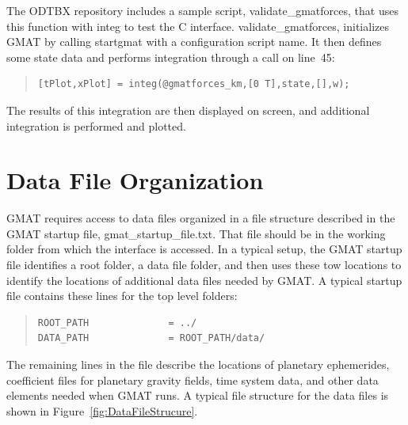 \documentclass[letterpaper,10pt]{article}
\begin{document}
The ODTBX repository includes a sample script, validate\_gmatforces, that uses this function with integ to test the C interface.  validate\_gmatforces, initializes GMAT by calling startgmat with a configuration script name.  It then defines some state data and performs integration through a call on line~45:

\begin{quote}
\lstset{language=Matlab, numbers=left, numberstyle=\tiny}
\begin{lstlisting}[firstnumber=45]
[tPlot,xPlot] = integ(@gmatforces_km,[0 T],state,[],w);
\end{lstlisting}
\end{quote}

\noindent The results of this integration are then displayed on screen, and additional integration is performed and plotted.

\appendix

\section{\label{sec:DataFileOrganization}Data File Organization}

GMAT requires access to data files organized in a file structure described in the GMAT startup file, gmat\_startup\_file.txt.  That file should be in the working folder from which the interface is accessed.  In a typical setup, the GMAT startup file identifies a root folder, a data file folder, and then uses these tow locations to identify the locations of additional data files needed by GMAT.  A typical startup file contains these lines for the top level folders:

\begin{quote}
\begin{verbatim}
ROOT_PATH              = ../
DATA_PATH              = ROOT_PATH/data/
\end{verbatim}
\end{quote}

\noindent The remaining lines in the file describe the locations of planetary ephemerides, coefficient files for planetary gravity fields, time system data, and other data elements needed when GMAT runs.  A typical file structure for the data files is shown in Figure~\ref{fig:DataFileStrucure}.
\end{document}
